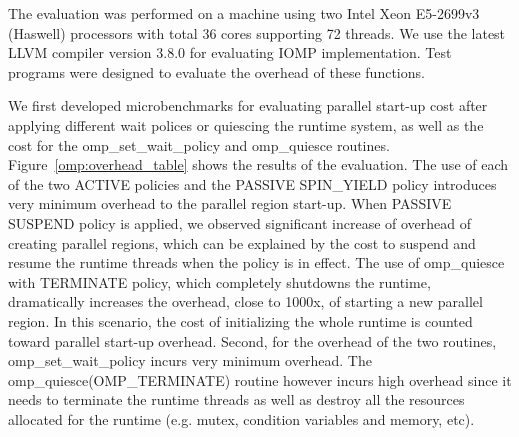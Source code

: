 The evaluation was performed on a machine using two Intel\regtm{} Xeon\regtm{} E5-2699v3 (Haswell) processors with total 36 cores supporting 72 threads. We use the latest
LLVM compiler version 3.8.0 for evaluating IOMP implementation. Test programs were designed to evaluate the overhead of these functions. 

We first developed microbenchmarks for evaluating parallel start-up cost after applying different wait polices or 
quiescing the runtime system, as well as the cost for the {\sf omp\_set\_wait\_policy} and {\sf omp\_quiesce} 
routines.  
Figure~\ref{omp:overhead_table} shows the results of the evaluation. 
The use of each of the two {\sf ACTIVE} policies and the {\sf PASSIVE SPIN\_YIELD} policy 
introduces very minimum overhead to the {\sf parallel} region start-up. 
When {\sf PASSIVE SUSPEND} policy is applied, we observed significant increase of overhead of creating {\sf parallel} regions, 
which can be explained by the cost to suspend and resume the runtime threads when the policy is in effect. 
The use of {\sf omp\_quiesce} with {\sf TERMINATE} policy, which completely shutdowns the 
runtime, dramatically increases the overhead, close to 1000x, of starting a new {\sf parallel} region. In this 
scenario, the cost of initializing the whole runtime is counted toward {\sf parallel} start-up overhead. Second, 
for the overhead of the two routines, {\sf omp\_set\_wait\_policy} incurs very minimum overhead. The 
{\sf omp\_quiesce(OMP\_TERMINATE)} routine however incurs high overhead since it needs to terminate the runtime threads as well as 
destroy all the resources allocated for the runtime (e.g. mutex, condition variables and memory, etc). 



